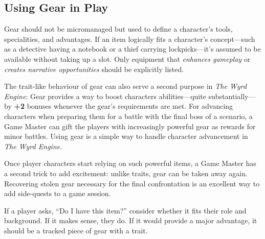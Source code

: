 \subsection{Using Gear in Play}
Gear should not be micromanaged but used to define a character’s tools, specialities, and advantages. If an item logically fits a character’s concept—such as a detective having a notebook or a thief carrying lockpicks—it’s assumed to be available without taking up a slot. Only equipment that \emph{enhances gameplay} or \emph{creates narrative opportunities} should be explicitly listed.

The trait-like behaviour of gear can also serve a second purpose in \emph{The Wyrd Engine}: Gear provides a way to boost characters abilities---quite substantially---by \textbf{+2} bonuses whenever the gear's requirements are met. For advancing characters when preparing them for a battle with the final boss of a scenario, a Game Master can gift the players with increasingly powerful gear as rewards for minor battles. Using gear is a simple way to handle character advancement in \emph{The Wyrd Engine}.

Once player characters start relying on such powerful items, a Game Master has a second trick to add excitement: unlike traits, gear can be taken away again. Recovering stolen gear necessary for the final confrontation is an excellent way to add side-quests to a game session.

\begin{WyrdGmTips}
	If a player asks, “Do I have this item?” consider whether it fits their role and background. If it makes sense, they do. If it would provide a major advantage, it should be a tracked piece of gear with a trait.
\end{WyrdGmTips}

